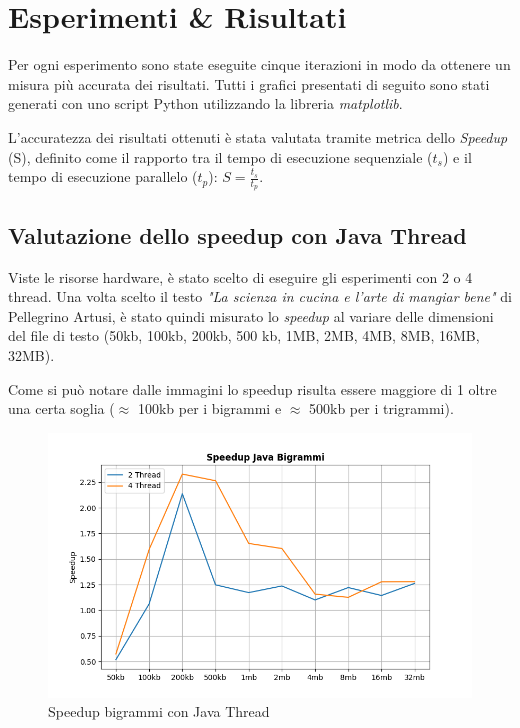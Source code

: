 \documentclass[10pt,twocolumn,letterpaper]{article}
\begin{document}
\section{Esperimenti \& Risultati}
Per ogni esperimento sono state eseguite cinque iterazioni in modo da ottenere un misura più accurata dei risultati.
Tutti i grafici presentati di seguito sono stati generati con uno script Python utilizzando la libreria \textit{matplotlib}.

L’accuratezza dei risultati ottenuti è stata valutata tramite metrica dello \textit{Speedup} (S), definito come il rapporto tra il tempo di esecuzione sequenziale ($t_s$) e il tempo di esecuzione parallelo ($t_p$): $S = \frac{t_s}{t_p}$.

\subsection{Valutazione dello speedup con Java Thread}
Viste le risorse hardware, è stato scelto di eseguire gli esperimenti con 2 o 4 thread.
Una volta scelto il testo \textit{"La scienza in cucina e l'arte di mangiar bene"} di Pellegrino Artusi, è stato quindi misurato lo \textit{speedup} al variare delle dimensioni del file di testo (50kb, 100kb, 200kb, 500 kb, 1MB, 2MB, 4MB, 8MB, 16MB, 32MB).

Come si può notare dalle immagini lo speedup risulta essere maggiore di 1 oltre una certa soglia ($\approx$ 100kb per i bigrammi e  $\approx$ 500kb per i trigrammi).

\begin{figure}[h]
\includegraphics[width=\linewidth]{Plots/speedup_java_bigrammi.png}
\caption{Speedup bigrammi con Java Thread}
\end{figure}
\end{document}
